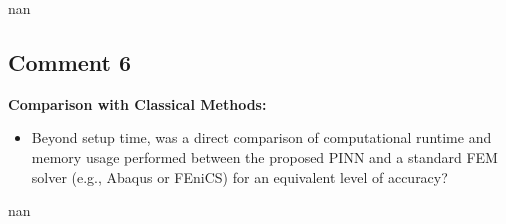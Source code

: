 \documentclass{ar2rc}
\begin{document}
  \AR nan

	\subsection{Comment 6}

  \RC\textbf{Comparison with Classical Methods:}
    \begin{itemize}
        \item Beyond setup time, was a direct comparison of computational runtime and memory usage performed between the proposed PINN and a standard FEM solver (e.g., Abaqus or FEniCS) for an equivalent level of accuracy?
    \end{itemize}

  \AR nan


	
\end{document}
